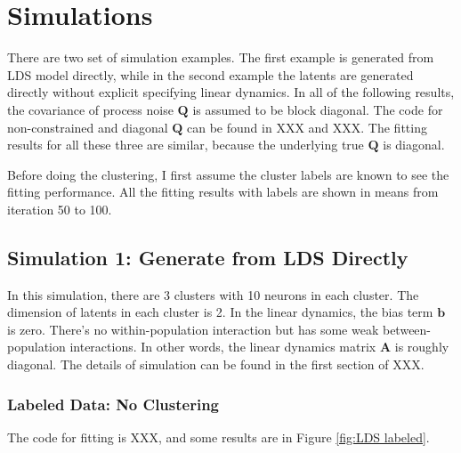 \documentclass[]{article}
\begin{document}
\section{Simulations}
There are two set of simulation examples. The first example is generated from LDS model directly, while in the second example the latents are generated directly without explicit specifying linear dynamics. In all of the following results, the covariance of process noise \(\mathbf{Q}\) is assumed to be block diagonal. The code for non-constrained and diagonal \(\mathbf{Q}\) can be found in XXX and XXX. The fitting results for all these three are similar, because the underlying true \(\mathbf{Q}\) is diagonal.

Before doing the clustering, I first assume the cluster labels are known to see the fitting performance. All the fitting results with labels are shown in means from iteration 50 to 100.

\subsection{Simulation 1: Generate from LDS Directly}
In this simulation, there are 3 clusters with 10 neurons in each cluster. The dimension of latents in each cluster is 2. In the linear dynamics, the bias term \(\mathbf{b}\) is zero. There's no within-population interaction but has some weak between-population interactions. In other words, the linear dynamics matrix \(\mathbf{A}\) is roughly diagonal. The details of simulation can be found in the first section of XXX.

\subsubsection{Labeled Data: No Clustering}
The code for fitting is XXX, and some results are in Figure \ref{fig:LDS labeled}.
\end{document}
